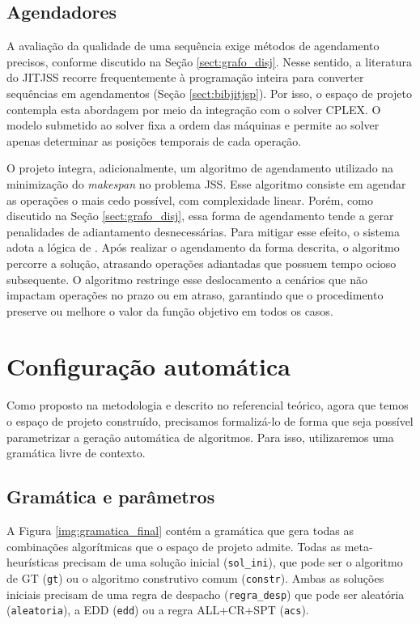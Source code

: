 \subsection{Agendadores}

A avaliação da qualidade de uma sequência exige métodos de agendamento precisos, conforme discutido na Seção \ref{sect:grafo_disj}. Nesse sentido, a literatura do \ac{JITJSS} recorre frequentemente à programação inteira para converter sequências em agendamentos (Seção \ref{sect:bibjitjsp}). Por isso, o espaço de projeto contempla esta abordagem por meio da integração com o solver CPLEX. O modelo submetido ao solver fixa a ordem das máquinas e permite ao solver apenas determinar as posições temporais de cada operação.

O projeto integra, adicionalmente, um algoritmo de agendamento utilizado na minimização do \textit{makespan} no problema \ac{JSS}. Esse algoritmo consiste em agendar as operações o mais cedo possível, com complexidade linear. Porém, como discutido na Seção \ref{sect:grafo_disj}, essa forma de agendamento tende a gerar penalidades de adiantamento desnecessárias. Para mitigar esse efeito, o sistema adota a lógica de \cite{ferreira2023}. Após realizar o agendamento da forma descrita, o algoritmo percorre a solução, atrasando operações adiantadas que possuem tempo ocioso subsequente. O algoritmo restringe esse deslocamento a cenários que não impactam operações no prazo ou em atraso, garantindo que o procedimento preserve ou melhore o valor da função objetivo em todos os casos.

\section{Configuração automática} \label{sect:confauto}

Como proposto na metodologia e descrito no referencial teórico, agora que temos o espaço de projeto construído, precisamos formalizá-lo de forma que seja possível parametrizar a geração automática de algoritmos. Para isso, utilizaremos uma gramática livre de contexto.

\subsection{Gramática e parâmetros}

A Figura \ref{img:gramatica_final} contém a gramática que gera todas as combinações algorítmicas que o espaço de projeto admite. Todas as meta-heurísticas precisam de uma solução inicial (\texttt{sol\_ini}), que pode ser o algoritmo de \ac{GT} (\texttt{gt}) ou o algoritmo construtivo comum (\texttt{constr}). Ambas as soluções iniciais precisam de uma regra de despacho (\texttt{regra\_desp}) que pode ser aleatória (\texttt{aleatoria}), a \ac{EDD} (\texttt{edd}) ou a regra ALL+CR+SPT (\texttt{acs}).

